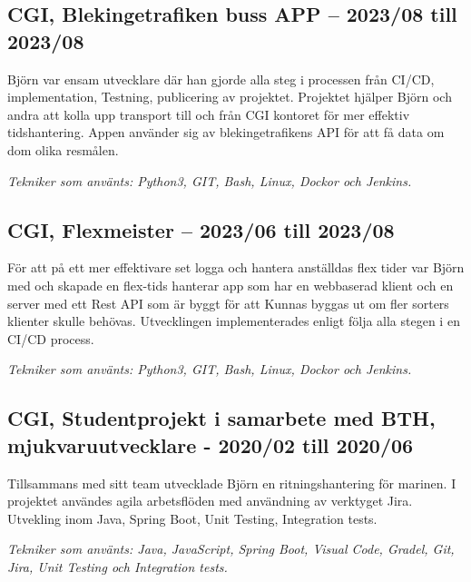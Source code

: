 \begin{minipage}[t]{0.7\textwidth}
    \subsection*{\textcolor{colorTitelErfarenhet}{CGI, Blekingetrafiken buss APP – 2023/08 till 2023/08}}
    Björn var ensam utvecklare där han gjorde alla steg i processen från CI/CD, implementation, 
    Testning, publicering av projektet. Projektet hjälper Björn och andra att kolla upp transport 
    till och från CGI kontoret för mer effektiv tidshantering. Appen använder sig av blekingetrafikens 
    API för att få data om dom olika resmålen.
    
    \vspace{5pt}\textit{Tekniker som använts: Python3, GIT, Bash, Linux, Dockor och Jenkins.}
    
    \vspace{15pt} %
    
    \subsection*{\textcolor{colorTitelErfarenhet}{CGI, Flexmeister – 2023/06 till 2023/08}}
    För att på ett mer effektivare set logga och hantera anställdas flex tider var Björn med och 
    skapade en flex-tids hanterar app som har en webbaserad klient och en server med ett Rest API som är 
    byggt för att Kunnas byggas ut om fler sorters klienter skulle behövas. Utvecklingen implementerades 
    enligt följa alla stegen i en CI/CD process.
  
    \vspace{5pt}\textit{Tekniker som använts: Python3, GIT, Bash, Linux, Dockor och Jenkins.}
  
    \vspace{15pt} %
    \subsection*{\textcolor{colorTitelErfarenhet}{CGI, Studentprojekt i samarbete med BTH, mjukvaruutvecklare - 2020/02 till 2020/06}}
    Tillsammans med sitt team utvecklade Björn en ritningshantering för marinen. 
    I projektet användes agila arbetsflöden med användning av verktyget Jira. 
    Utvekling inom Java, Spring Boot, Unit Testing, Integration tests.
    
    \vspace{5pt}\textit{Tekniker som använts: Java, JavaScript, Spring Boot, Visual Code, Gradel, Git, Jira, Unit Testing och Integration tests.} 
    

\end{minipage}
